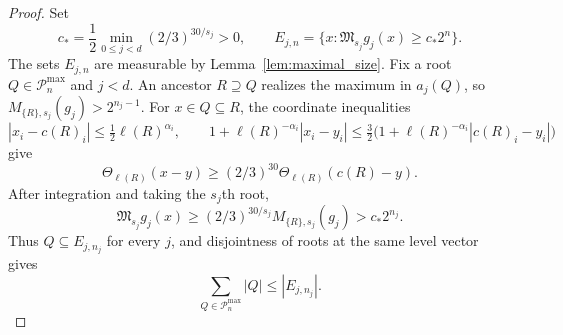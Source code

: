 \documentclass[12pt,reqno]{amsart}
\theoremstyle{plain}
\theoremstyle{definition}
\theoremstyle{remark}
\numberwithin{equation}{section}
\begin{document}
\begin{proof}
Set
\begin{equation}\label{eq:stopping_level_constant}
 c_*=\frac12\min_{0\le j<d}(2/3)^{30/s_j}>0,
 \qquad E_{j,n}=\{x:\mathfrak M_{s_j}g_j(x)\ge c_*2^n\}.
\end{equation}
The sets $E_{j,n}$ are measurable by Lemma~\ref{lem:maximal_size}.
Fix a root $Q\in\mathcal P_n^{\max}$ and $j<d$. An ancestor
$R\supseteq Q$ realizes the maximum in $a_j(Q)$, so
$M_{\{R\},s_j}(g_j)>2^{n_j-1}$. For $x\in Q\subseteq R$,
the coordinate inequalities
\[
 |x_i-c(R)_i|\le\tfrac12\ell(R)^{\alpha_i},\qquad
 1+\ell(R)^{-\alpha_i}|x_i-y_i|
 \le\tfrac32\big(1+\ell(R)^{-\alpha_i}|c(R)_i-y_i|\big)
\]
give
\[
 \Theta_{\ell(R)}(x-y)\ge(2/3)^{30}
                              \Theta_{\ell(R)}(c(R)-y).
\]
After integration and taking the $s_j$th root,
\[
 \mathfrak M_{s_j}g_j(x)
 \ge(2/3)^{30/s_j}M_{\{R\},s_j}(g_j)>c_*2^{n_j}.
\]
Thus $Q\subseteq E_{j,n_j}$ for every $j$, and disjointness of
roots at the same level vector gives
\begin{equation}\label{eq:stopping_root_measure}
 \sum_{Q\in\mathcal P_n^{\max}}|Q|\le |E_{j,n_j}|.
\end{equation}


\end{proof}
\end{document}
